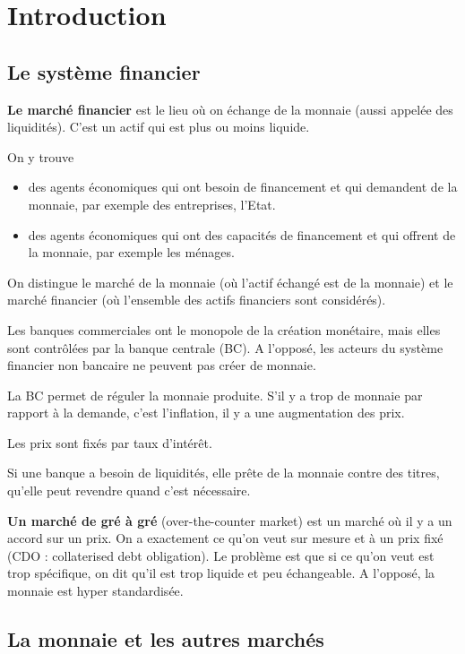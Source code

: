 \chapter{Introduction}

\section{Le système financier}
\textbf{Le marché financier} est le lieu où on échange de la monnaie (aussi appelée des liquidités). C'est un actif qui est plus ou moins liquide.

On y trouve

\begin{itemize}
	\item des agents économiques qui ont besoin de financement et qui demandent de la monnaie, par exemple des entreprises, l'Etat.
	\item des agents économiques qui ont des capacités de financement et qui offrent de la monnaie, par exemple les ménages.
\end{itemize}

On distingue le marché de la monnaie (où l'actif échangé est de la monnaie) et le marché financier (où l'ensemble des actifs financiers sont considérés).


Les banques commerciales ont le monopole de la création monétaire, mais elles sont contrôlées par la banque centrale (BC). A l'opposé, les acteurs du système financier non bancaire ne peuvent pas créer de monnaie.

La BC permet de réguler la monnaie produite. S'il y a trop de monnaie par rapport à la demande, c'est l'inflation, il y a une augmentation des prix.

Les prix sont fixés par taux d'intérêt.

Si une banque a besoin de liquidités, elle prête de la monnaie contre des titres, qu'elle peut revendre quand c'est nécessaire.

\textbf{Un marché de gré à gré} (over-the-counter market) est un marché où il y a un accord sur un prix. On a exactement ce qu'on veut sur mesure et à un prix fixé (CDO : collaterised debt obligation). Le problème est que si ce qu'on veut est trop spécifique, on dit qu'il est trop liquide et peu échangeable. A l'opposé, la monnaie est hyper standardisée.

\section{La monnaie et les autres marchés}

